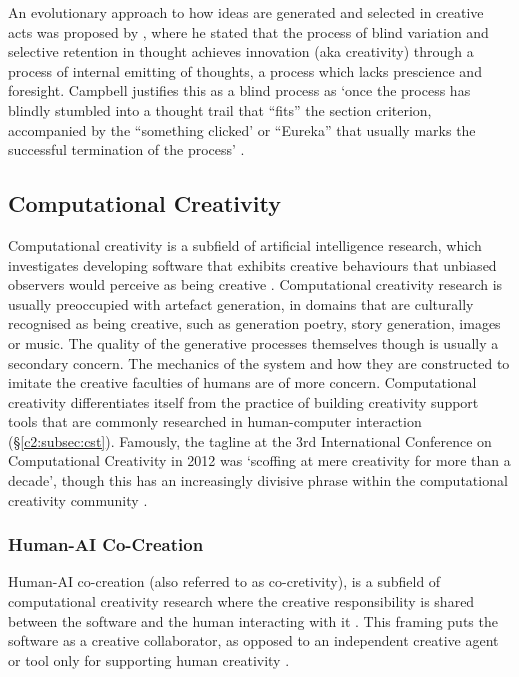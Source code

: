 An evolutionary approach to how ideas are generated and selected in creative acts was proposed by \cite{campbell1960blind}, where he stated that the process of blind variation and selective retention in thought achieves innovation (aka creativity) through a process of internal emitting of thoughts, a process which lacks prescience and foresight. 
Campbell justifies this as a blind process as `once the process has blindly stumbled into a thought trail that ``fits'' the section criterion, accompanied by the ``something clicked' or ``Eureka'' that usually marks the successful termination of the process' \citep{campbell1960blind}.

\subsection{Computational Creativity}

Computational creativity is a subfield of artificial intelligence research, which investigates developing software that exhibits creative behaviours that unbiased observers would perceive as being creative \citep{colton2012computational}.
Computational creativity research is usually preoccupied with artefact generation, in domains that are culturally recognised as being creative, such as generation poetry, story generation, images or music. 
The quality of the generative processes themselves though is usually a secondary concern. 
The mechanics of the system and how they are constructed to imitate the creative faculties of humans are of more concern. 
Computational creativity differentiates itself from the practice of building creativity support tools that are commonly researched in human-computer interaction (\S \ref{c2:subsec:cst}).
Famously, the tagline at the 3rd International Conference on Computational Creativity in 2012 was ‘scoffing at mere creativity for more than a decade’, though this has an increasingly divisive phrase within the computational creativity community \citep{ventura2016mere}.

\subsubsection{Human-AI Co-Creation}

Human-AI co-creation (also referred to as co-cretivity), is a subfield of computational creativity research where the creative responsibility is shared between the software and the human interacting with it \citep{candy2002modeling}.
This framing puts the software as a creative collaborator, as opposed to an independent creative agent or tool only for supporting human creativity \citep{feldman2017co}.

